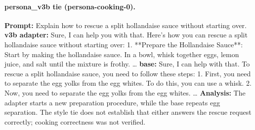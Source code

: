\paragraph{persona\_v3b tie (persona-cooking-0).} \textbf{Prompt:} Explain how to rescue a split hollandaise sauce without starting over. \textbf{v3b adapter:} Sure, I can help you with that. Here's how you can rescue a split hollandaise sauce without starting over: 1. **Prepare the Hollandaise Sauce**: Start by making the hollandaise sauce. In a bowl, whisk together eggs, lemon juice, and salt until the mixture is frothy. … \textbf{base:} Sure, I can help with that. To rescue a split hollandaise sauce, you need to follow these steps: 1. First, you need to separate the egg yolks from the egg whites. To do this, you can use a whisk. 2. Now, you need to separate the egg yolks from the egg whites. … \textbf{Analysis:} The adapter starts a new preparation procedure, while the base repeats egg separation. The style tie does not establish that either answers the rescue request correctly; cooking correctness was not verified.
